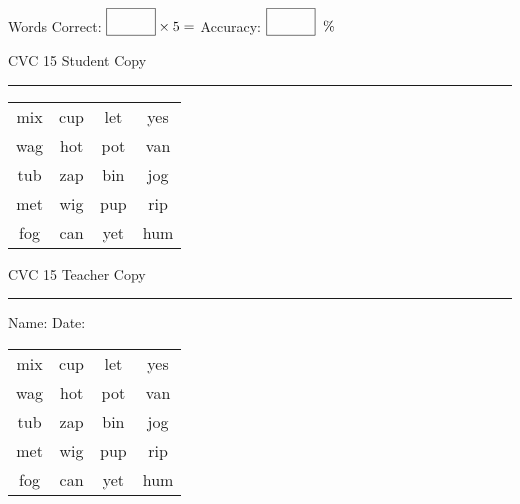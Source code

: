 \documentclass{memoir}
\begin{document}
\small

Words Correct: $\fbox{\phantom{\huge 100}} \times 5 = $ Accuracy: $\fbox{\phantom{\huge 100}}\;\; \%$ 

\vfill

\newpage


\footnotesize \noindent
CVC 15 \hfill Student Copy
\smallskip
\hrule

\Large

\setlength{\tabcolsep}{14pt}
\def\arraystretch{2}

{\selectfont


\begin{vplace}[0.5]
\begin{center}
\begin{tabular}{cccc}
mix & cup & let & yes \\
wag & hot & pot & van \\
tub & zap & bin & jog \\
met & wig & pup & rip \\
fog & can & yet & hum \\
\end{tabular}
\end{center}
\end{vplace}

}

\newpage

\footnotesize \noindent
CVC 15 \hfill Teacher Copy
\smallskip
\hrule

\small

\vfill

\noindent
Name: \underline{\hspace{1.75in}} \hfill Date: \underline{\hspace{1in}}

\Large

{\selectfont


\begin{vplace}[0.5]
\begin{center}
\begin{tabular}{cccc}
mix & cup & let & yes \\
wag & hot & pot & van \\
tub & zap & bin & jog \\
met & wig & pup & rip \\
fog & can & yet & hum \\
\end{tabular}
\end{center}
\end{vplace}



}
\end{document}
